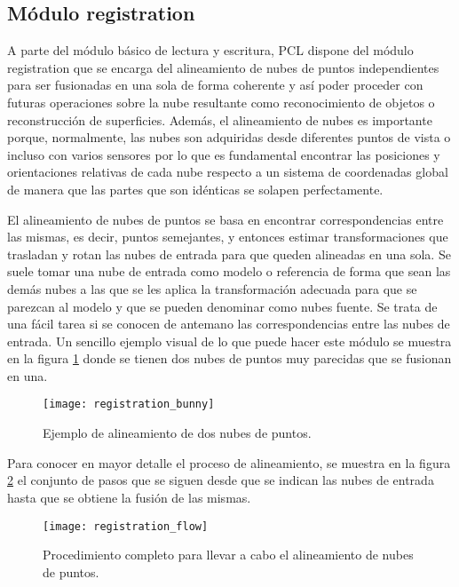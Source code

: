 \subsection{Módulo registration}
A parte del módulo básico de lectura y escritura, PCL dispone del módulo registration\cite{registration} que se encarga del alineamiento de nubes de puntos independientes para ser fusionadas en una sola de forma coherente y así poder proceder con futuras operaciones sobre la nube resultante como reconocimiento de objetos o reconstrucción de superficies. Además, el alineamiento de nubes es importante porque, normalmente, las nubes son adquiridas desde diferentes puntos de vista o incluso con varios sensores por lo que es fundamental encontrar las posiciones y orientaciones relativas de cada nube respecto a un sistema de coordenadas global de manera que las partes que son idénticas se solapen perfectamente. 

El alineamiento de nubes de puntos se basa en encontrar correspondencias entre las mismas, es decir, puntos semejantes, y entonces estimar transformaciones que trasladan y rotan las nubes de entrada para que queden alineadas en una sola. Se suele tomar una nube de entrada como modelo o referencia de forma que sean las demás nubes a las que se les aplica la transformación adecuada para que se parezcan al modelo y que se pueden denominar como nubes fuente. Se trata de una fácil tarea si se conocen de antemano las correspondencias entre las nubes de entrada. Un sencillo ejemplo visual de lo que puede hacer este módulo se muestra en la figura \ref{fig:registration_bunny} donde se tienen dos nubes de puntos muy parecidas que se fusionan en una. 


\begin{figure}
\centering
\texttt{[image: registration\_bunny]}
\caption{Ejemplo de alineamiento de dos nubes de puntos.}\label{fig:registration_bunny}
\end{figure}

Para conocer en mayor detalle el proceso de alineamiento, se muestra en la figura \ref{fig:registration_flow} el conjunto de pasos que se siguen desde que se indican las nubes de entrada hasta que se obtiene la fusión de las mismas.

\begin{figure}
\centering
\texttt{[image: registration\_flow]}
\caption{Procedimiento completo para llevar a cabo el alineamiento de nubes de puntos.}\label{fig:registration_flow}
\end{figure}


